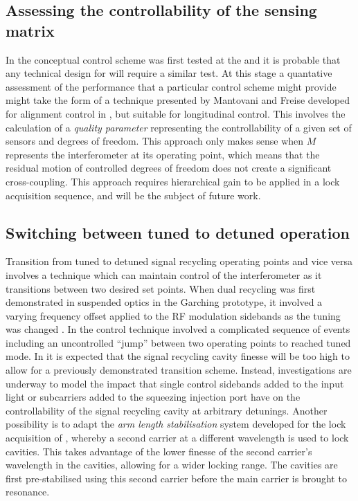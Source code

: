 \subsection{Assessing the controllability of the sensing matrix}
In \ALIGO{} the conceptual control scheme was first tested at the \CALTECHFORTYM{} and it is probable that any technical design for \ETLF{} will require a similar test. At this stage a quantative assessment of the performance that a particular control scheme might provide might take the form of a technique presented by Mantovani and Freise \cite{Mantovani2008} developed for alignment control in \VIRGO{}, but suitable for longitudinal control. This involves the calculation of a \emph{quality parameter} representing the controllability of a given set of sensors and degrees of freedom. This approach only makes sense when $M$ represents the interferometer at its operating point, which means that the residual motion of controlled degrees of freedom does not create a significant cross-coupling. This approach requires hierarchical gain to be applied in a lock acquisition sequence, and will be the subject of future work.

\subsection{Switching between tuned to detuned operation}
Transition from tuned to detuned signal recycling operating points and vice versa involves a technique which can maintain control of the interferometer as it transitions between two desired set points. When dual recycling was first demonstrated in suspended optics in the Garching prototype, it involved a varying frequency offset applied to the \gls{RF} modulation sidebands as the tuning was changed \cite{Freise2000}. In \GEO{} the control technique involved a complicated sequence of events \cite{Grote2004} including an uncontrolled ``jump'' between two operating points \cite{Hild2007} to reached tuned mode. In \ETLF{} it is expected that the signal recycling cavity finesse will be too high to allow for a previously demonstrated transition scheme. Instead, investigations are underway to model the impact that single control sidebands added to the input light or subcarriers added to the squeezing injection port have on the controllability of the signal recycling cavity at arbitrary detunings. Another possibility is to adapt the \emph{arm length stabilisation} system developed for the lock acquisition of \ALIGO{} \cite{Mullavey2012, Staley2014}, whereby a second carrier at a different wavelength is used to lock cavities. This takes advantage of the lower finesse of the second carrier's wavelength in the cavities, allowing for a wider locking range. The cavities are first pre-stabilised using this second carrier before the main carrier is brought to resonance.

